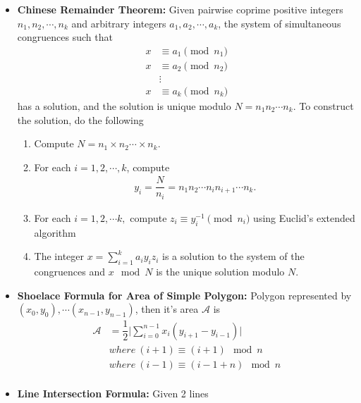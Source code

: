\documentclass[15pt,a4paper]{article}
\begin{document}
\begin{landscape}
\begin{multicols*}{3}
\begin{itemize}
    \item \textbf{Chinese Remainder Theorem:} Given pairwise coprime positive integers $n_1, n_2, \cdots, n_k$ and arbitrary integers $a_1, a_2, \cdots, a_k$, the system of simultaneous congruences such that
        \begin{align*}
            x &\equiv a_1 \pmod{n_1}\\
            x &\equiv a_2 \pmod{n_2}\\
              &\vdots\\
            x &\equiv a_k \pmod{n_k}
        \end{align*}
    has a solution, and the solution is unique modulo $N = n_1n_2\cdots n_k$.
    To construct the solution, do the following
        \begin{enumerate}
            \item Compute $N = n_1 \times n_2 \cdots \times n_k$.
            \item For each $i = 1, 2,\cdots,k$, compute
                \begin{align*}
                    y_i = \dfrac{N}{n_i} = n_1n_2\cdots n_in_{i + 1}\cdots n_k.
                \end{align*}
            \item For each $i = 1, 2, \cdots k,$ compute $z_i \equiv y_i^{-1} \pmod n_i$ using Euclid's extended algorithm
            \item The integer $x = \sum_{i = 1}^{k} a_iy_iz_i$ is a solution to the system of the congruences and $x \mod{N}$ is the unique solution modulo $N$.
        \end{enumerate}
    \item \textbf{Shoelace Formula for Area of Simple Polygon:} Polygon represented by $(x_0, y_0), \cdots (x_{n - 1}, y_{n - 1})$, then it's area $\mathcal{A}$ is
        \begin{equation*}
        \begin{aligned}
            \mathcal{A} &= \dfrac{1}{2} \bigg|\sum_{i = 0}^{n - 1}x_i(y_{i + 1} - y_{i - 1}) \bigg| \\
                        & where\ (i + 1) \equiv (i + 1) \mod {n}\\
                        & where\ (i - 1) \equiv (i - 1 + n) \mod {n}\\
        \end{aligned}
        \end{equation*}
    \item \textbf{Line Intersection Formula: } Given 2 lines
    \begin{equation*}

\end{equation*}
\end{itemize}
\end{multicols*}
\end{landscape}
\end{document}
